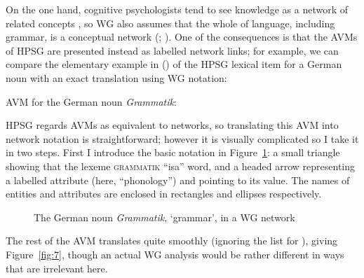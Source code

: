 \documentclass[output=paper]{langscibook}
\begin{document}
On the one hand, cognitive psychologists tend to see knowledge as a network of related concepts \citep[252]{Reisberg2007}, so WG also assumes that the whole of language, including grammar, is a conceptual network (\citealt[1]{Hudson84a-u}; \citeyear[1]{Hudson2007a-u}). One of the consequences is that the AVMs of HPSG are presented instead as labelled network links; for example, we can compare the elementary example in () of the HPSG lexical item for a German noun \citep[264]{MuellerGT-Eng2} with an exact translation using WG notation:

\ea
\label{fig:5}
AVM for the German noun \emph{Grammatik}:\\
\z

HPSG regards AVMs as equivalent to networks, so translating this AVM into network notation is straightforward; however it is visually complicated so I take it in two steps. First I introduce the basic notation in Figure~\ref{fig:6}: a small triangle showing that the lexeme \textsc{grammatik} ``isa'' word, and a headed arrow representing a labelled attribute (here, ``phonology'') and pointing to its value. The names of entities and attributes are enclosed in rectangles and ellipses respectively.

\begin{figure}
	\centering
{}
	\caption{The German noun \emph{Grammatik}, ‘grammar’, in a WG network}
	\label{fig:6}
\end{figure}

The rest of the AVM translates quite smoothly (ignoring the list for \spr), giving Figure~\ref{fig:7}, though an actual WG analysis would be rather different in ways that are irrelevant here.
\end{document}
